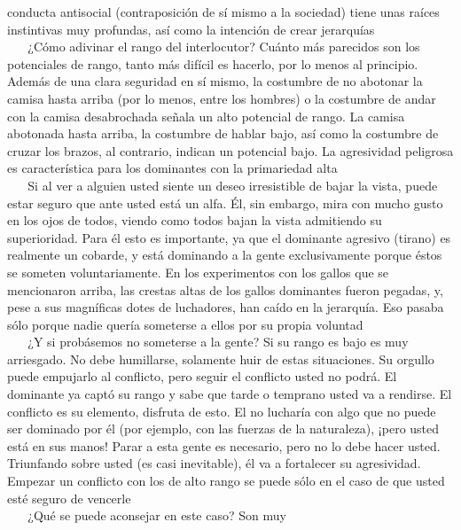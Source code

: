 conducta antisocial (contraposición de sí mismo a la sociedad) tiene
unas raíces instintivas muy profundas, así como la intención de crear
jerarquías\\
\hspace*{0.333em} ~ ~ ¿Cómo adivinar el rango del interlocutor? Cuánto
más parecidos son los potenciales de rango, tanto más difícil es
hacerlo, por lo menos al principio. Además de una clara seguridad en sí
mismo, la costumbre de no abotonar la camisa hasta arriba (por lo menos,
entre los hombres) o la costumbre de andar con la camisa desabrochada
señala un alto potencial de rango. La camisa abotonada hasta arriba, la
costumbre de hablar bajo, así como la costumbre de cruzar los brazos, al
contrario, indican un potencial bajo. La agresividad peligrosa es
característica para los dominantes con la primariedad alta\\
\hspace*{0.333em} ~ ~ Si al ver a alguien usted siente un deseo
irresistible de bajar la vista, puede estar seguro que ante usted está
un alfa. Él, sin embargo, mira con mucho gusto en los ojos de todos,
viendo como todos bajan la vista admitiendo su superioridad. Para él
esto es importante, ya que el dominante agresivo (tirano) es realmente
un cobarde, y está dominando a la gente exclusivamente porque éstos se
someten voluntariamente. En los experimentos con los gallos que se
mencionaron arriba, las crestas altas de los gallos dominantes fueron
pegadas, y, pese a sus magníficas dotes de luchadores, han caído en la
jerarquía. Eso pasaba sólo porque nadie quería someterse a ellos por su
propia voluntad\\
\hspace*{0.333em} ~ ~ ¿Y si probásemos no someterse a la gente? Si su
rango es bajo es muy arriesgado. No debe humillarse, solamente huir de
estas situaciones. Su orgullo puede empujarlo al conflicto, pero seguir
el conflicto usted no podrá. El dominante ya captó su rango y sabe que
tarde o temprano usted va a rendirse. El conflicto es su elemento,
disfruta de esto. El no lucharía con algo que no puede ser dominado por
él (por ejemplo, con las fuerzas de la naturaleza), ¡pero usted está en
sus manos! Parar a esta gente es necesario, pero no lo debe hacer usted.
Triunfando sobre usted (es casi inevitable), él va a fortalecer su
agresividad. Empezar un conflicto con los de alto rango se puede sólo en
el caso de que usted esté seguro de vencerle\\
\hspace*{0.333em} ~ ~ ¿Qué se puede aconsejar en este caso? Son muy
